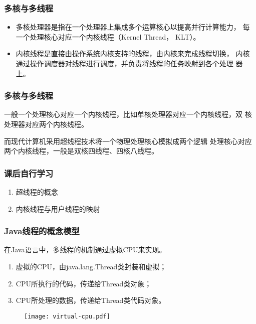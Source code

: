 \begin{frame}[fragile]
  \frametitle{多核与多线程}
  \begin{itemize}
  \item 多核处理器是指在一个处理器上集成多个运算核心以提高并行计算能力，
    每一个处理核心对应一个内核线程（Kernel Thread， KLT）。
  \item 内核线程是直接由操作系统内核支持的线程，由内核来完成线程切换，
    内核通过操作调度器对线程进行调度，并负责将线程的任务映射到各个处理
    器上。
  \end{itemize}

\end{frame}

\begin{frame}[fragile]
  \frametitle{多核与多线程}
  一般一个处理核心对应一个内核线程，比如单核处理器对应一个内核线程，双
  核处理器对应两个内核线程。

  {\Red\kai 而现代计算机采用超线程技术将一个物理处理核心模拟成两个逻辑
    处理核心对应两个内核线程，一般是双核四线程、四核八线程。}

  \begin{figure}
\centering
{}
\end{figure}
\end{frame}

\begin{frame}[fragile]
  \frametitle{课后自行学习}
  \begin{enumerate}
  \item 超线程的概念
  \item 内核线程与用户线程的映射
  \end{enumerate}
\end{frame}


\begin{frame}[fragile] %
\frametitle{Java线程的概念模型}

在Java语言中，多线程的机制通过虚拟CPU来实现。

\begin{enumerate}\kai
\item 虚拟的CPU，由java.lang.Thread类封装和虚拟；
\item CPU所执行的代码，传递给Thread类对象；
\item CPU所处理的数据，传递给Thread类代码对象。
\end{enumerate}
\begin{figure}
\centering
\texttt{[image: virtual-cpu.pdf]}
\end{figure}
\end{frame}

